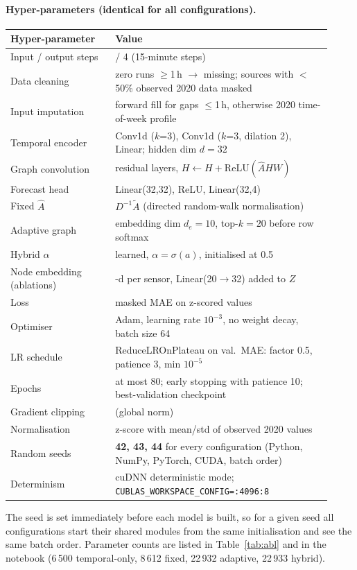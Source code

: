 \documentclass[11pt,a4paper]{article}
\begin{document}
\paragraph{Hyper-parameters (identical for all configurations).}
\begin{center}\small
\begin{tabular}{>{\raggedright\arraybackslash}p{0.30\linewidth}>{\raggedright\arraybackslash}p{0.62\linewidth}}
\toprule
Hyper-parameter & Value\\
\midrule
Input / output steps & 8 / 4 (15-minute steps)\\
Data cleaning & zero runs $\geq$1\,h $\to$ missing; sources with $<$50\% observed 2020 data masked\\
Input imputation & forward fill for gaps $\leq$1\,h, otherwise 2020 time-of-week profile\\
Temporal encoder & Conv1d ($k$=3), Conv1d ($k$=3, dilation 2), Linear; hidden dim $d=32$\\
Graph convolution & 2 residual layers, $H \leftarrow H+\mathrm{ReLU}(\hat A H W)$\\
Forecast head & Linear(32,32), ReLU, Linear(32,4)\\
Fixed $\hat A$ & $D^{-1}\tilde A$ (directed random-walk normalisation)\\
Adaptive graph & embedding dim $d_e=10$, top-$k=20$ before row softmax\\
Hybrid $\alpha$ & learned, $\alpha=\sigma(a)$, initialised at 0.5\\
Node embedding (ablations) & 20-d per sensor, Linear(20$\to$32) added to $Z$\\
Loss & masked MAE on z-scored values\\
Optimiser & Adam, learning rate $10^{-3}$, no weight decay, batch size 64\\
LR schedule & ReduceLROnPlateau on val.\ MAE: factor 0.5, patience 3, min $10^{-5}$\\
Epochs & at most 80; early stopping with patience 10; best-validation checkpoint\\
Gradient clipping & 5.0 (global norm)\\
Normalisation & z-score with mean/std of observed 2020 values\\
Random seeds & \textbf{42, 43, 44} for every configuration (Python, NumPy, PyTorch, CUDA, batch order)\\
Determinism & cuDNN deterministic mode; \texttt{CUBLAS\_WORKSPACE\_CONFIG=:4096:8}\\
\bottomrule
\end{tabular}
\end{center}
The seed is set immediately before each model is built, so for a given seed all configurations start their shared modules from the
same initialisation and see the same batch order. Parameter counts are listed in Table~\ref{tab:abl} and in the notebook
(6\,500 temporal-only, 8\,612 fixed, 22\,932 adaptive, 22\,933 hybrid).
\end{document}
